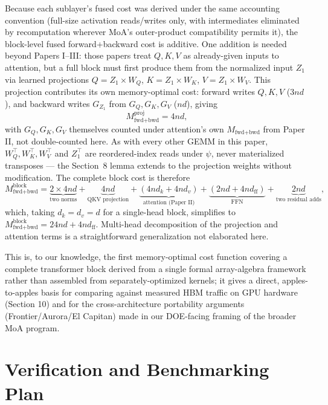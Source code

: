 \documentclass[11pt]{article}
\newcommand{\psii}{\psi}
\theoremstyle{definition}
\begin{document}
Because each
sublayer's fused cost was derived under the same accounting convention
(full-size activation reads/writes only, with intermediates eliminated
by recomputation wherever MoA's outer-product compatibility permits
it), the block-level fused forward+backward cost is additive. One
addition is needed beyond Papers I--III: those papers treat $Q,K,V$ as
already-given inputs to attention, but a full block must first produce
them from the normalized input $Z_1$ via learned projections $Q =
Z_1\times W_Q$, $K = Z_1\times W_K$, $V = Z_1\times W_V$. This
projection contributes its own memory-optimal cost: forward writes
$Q,K,V$ ($3nd$), and backward writes $G_{Z_1}$ from $G_Q,G_K,G_V$
($nd$), giving
\[
M^{\mathrm{proj}}_{\text{fwd+bwd}} = 4nd,
\]
with $G_Q,G_K,G_V$ themselves counted under attention's own
$M_{\text{fwd+bwd}}$ from Paper II, not double-counted here. As with
every other GEMM in this paper, $W_Q^{\top},W_K^{\top},W_V^{\top}$ and
$Z_1^{\top}$ are reordered-index reads under $\psii$, never
materialized transposes --- the Section~8 lemma extends to the
projection weights without modification. The complete block cost is
therefore
\[
M^{\mathrm{block}}_{\text{fwd+bwd}} =
\underbrace{2 \times 4nd}_{\text{two norms}} +
\underbrace{4nd}_{\text{QKV projection}} +
\underbrace{(4nd_k + 4nd_v)}_{\text{attention (Paper II)}} +
\underbrace{(2nd + 4nd_{\mathrm{ff}})}_{\text{FFN}} +
\underbrace{2nd}_{\text{two residual adds}},
\]
which, taking $d_k = d_v = d$ for a single-head block, simplifies to
$M^{\mathrm{block}}_{\text{fwd+bwd}} = 24nd + 4nd_{\mathrm{ff}}$.
Multi-head decomposition of the projection and attention terms is a
straightforward generalization not elaborated here.

This is, to our knowledge, the first memory-optimal cost function
covering a complete transformer block derived from a single formal
array-algebra framework rather than assembled from separately-optimized
kernels; it gives a direct, apples-to-apples basis for comparing against
measured HBM traffic on GPU hardware (Section 10) and for the
cross-architecture portability arguments (Frontier/Aurora/El Capitan)
made in our DOE-facing framing of the broader MoA program.

\section{Verification and Benchmarking Plan}
\end{document}
